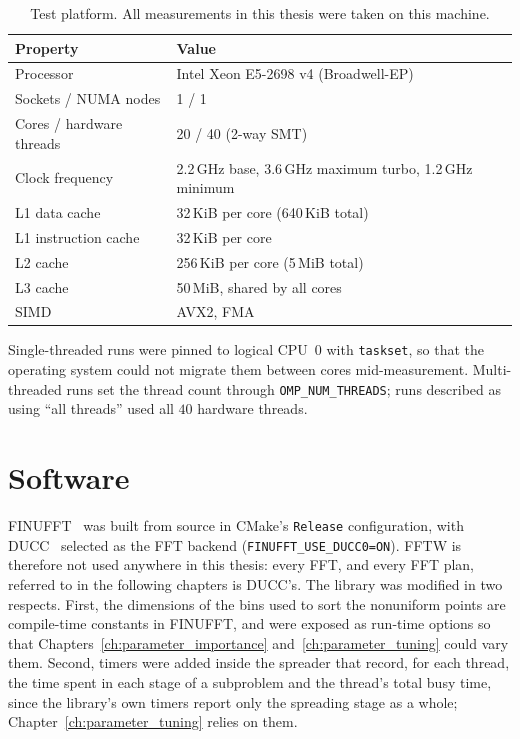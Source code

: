 \begin{table}[ht]
    \centering
    \begin{tabular}{|l|l|}
        \hline
        \textbf{Property} & \textbf{Value} \\
        \hline
        Processor & Intel Xeon E5-2698 v4 (Broadwell-EP) \\
        Sockets / NUMA nodes & 1 / 1 \\
        Cores / hardware threads & 20 / 40 (2-way SMT) \\
        Clock frequency & 2.2\,GHz base, 3.6\,GHz maximum turbo, 1.2\,GHz minimum \\
        L1 data cache & 32\,KiB per core (640\,KiB total) \\
        L1 instruction cache & 32\,KiB per core \\
        L2 cache & 256\,KiB per core (5\,MiB total) \\
        L3 cache & 50\,MiB, shared by all cores \\
        SIMD & AVX2, FMA \\
        \hline
    \end{tabular}
    \caption{Test platform. All measurements in this thesis were taken on this machine.}
    \label{tab:platform}
\end{table}

Single-threaded runs were pinned to logical CPU~0 with \texttt{taskset}, so that the operating system could not migrate them between cores mid-measurement. Multi-threaded runs set the thread count through \texttt{OMP\_NUM\_THREADS}; runs described as using ``all threads'' used all $40$ hardware threads.

\section{Software}
\label{sec:software}

FINUFFT~\cite{finufftsoftware} was built from source in CMake's \texttt{Release} configuration, with DUCC~\cite{ducc} selected as the FFT backend (\texttt{FINUFFT\_USE\_DUCC0=ON}). FFTW is therefore not used anywhere in this thesis: every FFT, and every FFT plan, referred to in the following chapters is DUCC's. The library was modified in two respects. First, the dimensions of the bins used to sort the nonuniform points are compile-time constants in FINUFFT, and were exposed as run-time options so that Chapters~\ref{ch:parameter_importance} and~\ref{ch:parameter_tuning} could vary them. Second, timers were added inside the spreader that record, for each thread, the time spent in each stage of a subproblem and the thread's total busy time, since the library's own timers report only the spreading stage as a whole; Chapter~\ref{ch:parameter_tuning} relies on them.


